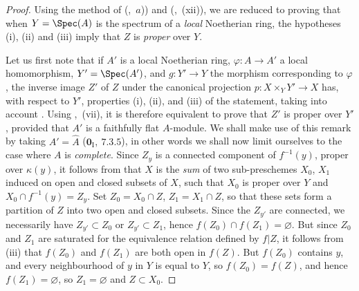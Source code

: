 \begin{proof}
Using the method of (,~$a$)) and (,~(xii)), we are reduced to proving that when $Y=\Spec(A)$ is the spectrum of a \emph{local} Noetherian ring, the hypotheses (i), (ii) and (iii) imply that $Z$ is \emph{proper} over $Y$.

Let us first note that if $A'$ is a local Noetherian ring, $\varphi:A\to A'$ a local homomorphism, $Y'=\Spec(A')$, and $g:Y'\to Y$ the morphism corresponding to $\varphi$, the inverse image $Z'$ of $Z$ under the canonical projection $p:X\times_Y Y'\to X$ has, with respect to $Y'$, properties (i), (ii), and (iii) of the statement, taking into account . Using ,~(vii), it is therefore equivalent to prove that $Z'$ is proper over $Y'$, provided that $A'$ is a faithfully flat $A$-module.
We shall make use of this remark by taking $A'=\hat{A}$ ($\mathbf{0}_{\mathrm{I}},~7.3.5$), in other words we shall now limit ourselves to the case where $A$ is \emph{complete}.
Since $Z_y$ is a connected component of $f^{-1}(y)$, proper over $\kappa(y)$, it follows from  that $X$ is the \emph{sum} of two sub-preschemes $X_0$, $X_1$ induced on open and closed subsets of $X$, such that $X_0$ is proper over $Y$ and $X_0\cap f^{-1}(y)=Z_y$.
Set $Z_0=X_0\cap Z$, $Z_1=X_1\cap Z$, so that these sets form a partition of $Z$ into two open and closed subsets.
Since the $Z_{y'}$ are connected, we necessarily have $Z_{y'}\subset Z_0$ or $Z_{y'}\subset Z_1$, hence $f(Z_0)\cap f(Z_1)=\varnothing$.
But since $Z_0$ and $Z_1$ are saturated for the equivalence relation defined by $f|Z$, it follows from (iii) that $f(Z_0)$ and $f(Z_1)$ are both open in $f(Z)$.
But $f(Z_0)$ contains $y$, and every neighbourhood of $y$ in $Y$ is equal to $Y$, so $f(Z_0)=f(Z)$, and hence $f(Z_1)=\varnothing$, so $Z_1=\varnothing$ and $Z\subset X_0$.


\end{proof}
